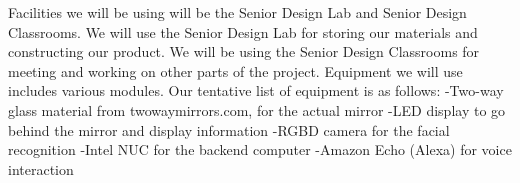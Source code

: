 Facilities we will be using will be the Senior Design Lab and Senior Design Classrooms. We will use the Senior Design Lab for storing our materials and constructing our product. We will be using the Senior Design Classrooms for meeting and working on other parts of the project.
Equipment we will use includes various modules. Our tentative list of equipment is as follows:\newline
-Two-way glass material from twowaymirrors.com, for the actual mirror\newline
-LED display to go behind the mirror and display information\newline
-RGBD camera for the facial recognition\newline
-Intel NUC for the backend computer\newline
-Amazon Echo (Alexa) for voice interaction